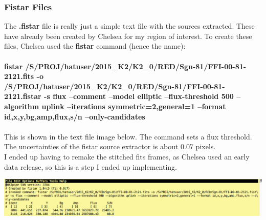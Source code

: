 \documentclass[11pt,letterpaper]{book} %
\begin{document}
\subsubsection*{Fistar Files}
The \textbf{.fistar} file is really just a simple text file with the sources extracted. 
These have already been created by Chelsea for my region of interest. To create these files, Chelsea used the \textbf{fistar} command (hence the name):\\ \\
\textbf{fistar /S/PROJ/hatuser/2015\_K2/K2\_0/RED/Sgn-81/FFI-00-81-2121.fits -o \\ 
/S/PROJ/hatuser/2015\_K2/K2\_0/RED/Sgn-81/FFI-00-81-2121.fistar -s flux --comment --model elliptic --flux-threshold 500 --algorithm uplink --iterations symmetric=2,general=1 --format id,x,y,bg,amp,flux,s/n --only-candidates} \\ \\ 
This is shown in the text file image below. The command sets a flux threshold. The uncertainties of the fistar source extractor is about 0.07 pixels. \\ 
I ended up having to remake the stitched fits frames, as Chelsea used an early data release, so this is a step I ended up implementing.\\

\begin{center}
\includegraphics[width=\textwidth]{fistarfile.png}
\end{center}
\end{document}

